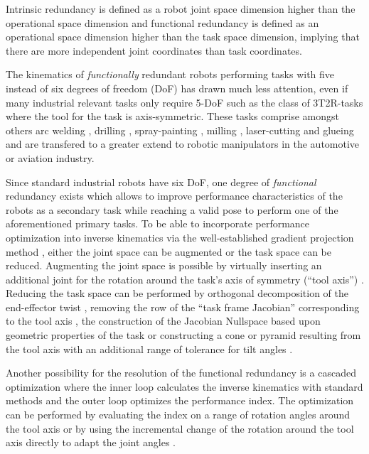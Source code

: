 \documentclass{svproc}
\begin{document}
Intrinsic redundancy is defined as a robot joint space dimension higher than the operational space dimension and functional redundancy is defined as an operational space dimension higher than the task space dimension, implying that there are more independent joint coordinates than task coordinates.

The kinematics of \emph{functionally} redundant robots performing tasks with five instead of six degrees of freedom (DoF) has drawn much less attention, even if many industrial relevant tasks only require 5-DoF such as the class of 3T2R-tasks where the tool for the task is axis-symmetric.
These tasks comprise amongst others arc welding \cite{HuoBar2005}, drilling \cite{ZhuQuCaoYan2013,GuoDonKe2015}, spray-painting \cite{FromGra2010}, milling \cite{MousaviGagBouRay2018}, laser-cutting and glueing and are transfered to a greater extend to robotic manipulators in the automotive or aviation industry.

Since standard industrial robots have six DoF, one degree of \emph{functional} redundancy exists which allows to improve performance characteristics of the robots as a secondary task while reaching a valid pose to perform one of the aforementioned primary tasks.
To be able to incorporate performance optimization into inverse kinematics via the well-established gradient projection method \cite{Yoshikawa1984}, either the joint space can be augmented or the task space can be reduced. %
Augmenting the joint space is possible by virtually inserting an additional joint for the rotation around the task's axis of symmetry (``tool axis'') \cite{Baron2000}.
Reducing the task space can be performed by orthogonal decomposition of the end-effector twist \cite{HuoBar2005}, removing the row of the ``task frame Jacobian'' corresponding to the tool axis \cite{Zlajpah2017}, the construction of the Jacobian Nullspace based upon geometric properties of the task \cite{LegerAng2016} or constructing a cone or pyramid resulting from the tool axis with an additional range of tolerance for tilt angles \cite{FromGra2010}.

Another possibility for the resolution of the functional redundancy is a cascaded optimization where the inner loop calculates the inverse kinematics with standard methods and the outer loop optimizes the performance index.
The optimization can be performed by evaluating the index on a range of rotation angles around the tool axis \cite{ZhuQuCaoYan2013} or by using the incremental change of the rotation around the tool axis directly to adapt the joint angles  \cite{GuoDonKe2015}.
\end{document}
